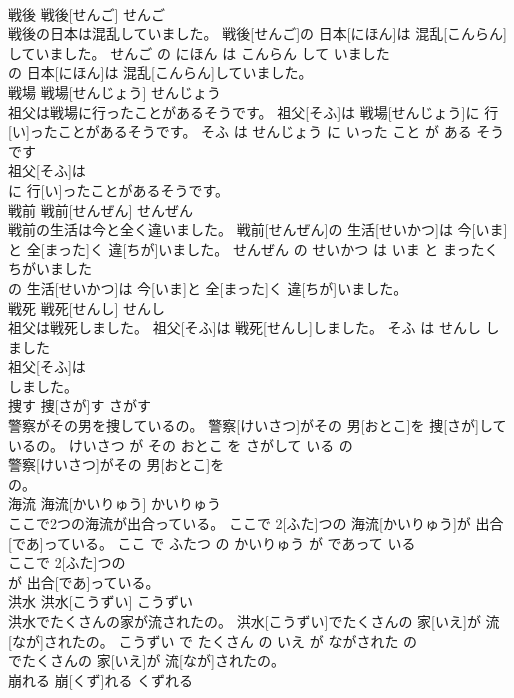 \documentclass[8pt]{extreport}
\begin{document}
\begin{CJK}{UTF8}{min}
\\	戦後	戦後[せんご]	せんご	
\\	戦後の日本は混乱していました。	戦後[せんご]の 日本[にほん]は 混乱[こんらん]していました。	せんご の にほん は こんらん して いました	
\\	の 日本[にほん]は 混乱[こんらん]していました。			
\\	戦場	戦場[せんじょう]	せんじょう	
\\	祖父は戦場に行ったことがあるそうです。	祖父[そふ]は 戦場[せんじょう]に 行[い]ったことがあるそうです。	そふ は せんじょう に いった こと が ある そう です	
\\	祖父[そふ]は
\\	に 行[い]ったことがあるそうです。			
\\	戦前	戦前[せんぜん]	せんぜん	
\\	戦前の生活は今と全く違いました。	戦前[せんぜん]の 生活[せいかつ]は 今[いま]と 全[まった]く 違[ちが]いました。	せんぜん の せいかつ は いま と まったく ちがいました	
\\	の 生活[せいかつ]は 今[いま]と 全[まった]く 違[ちが]いました。			
\\	戦死	戦死[せんし]	せんし	
\\	祖父は戦死しました。	祖父[そふ]は 戦死[せんし]しました。	そふ は せんし しました	
\\	祖父[そふ]は
\\	しました。			
\\	捜す	捜[さが]す	さがす	
\\	警察がその男を捜しているの。	警察[けいさつ]がその 男[おとこ]を 捜[さが]しているの。	けいさつ が その おとこ を さがして いる の	
\\	警察[けいさつ]がその 男[おとこ]を
\\	の。			
\\	海流	海流[かいりゅう]	かいりゅう	
\\	ここで2つの海流が出合っている。	ここで 2[ふた]つの 海流[かいりゅう]が 出合[であ]っている。	ここ で ふたつ の かいりゅう が であって いる	
\\	ここで 2[ふた]つの
\\	が 出合[であ]っている。			
\\	洪水	洪水[こうずい]	こうずい	
\\	洪水でたくさんの家が流されたの。	洪水[こうずい]でたくさんの 家[いえ]が 流[なが]されたの。	こうずい で たくさん の いえ が ながされた の	
\\	でたくさんの 家[いえ]が 流[なが]されたの。			
\\	崩れる	崩[くず]れる	くずれる	

\end{CJK}
\end{document}
